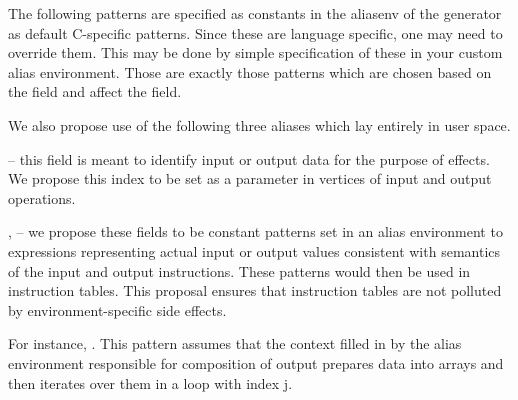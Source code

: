 The following patterns are specified as constants in the aliasenv of the generator as default C-specific patterns. Since these are language specific, one may need to override them. This may be done by simple specification of these in your custom alias environment. Those are exactly those patterns which are chosen based on the  field and affect the  field.

\begin{description}
\item {}
\item {}
\item {}
\item {}
\item {}
\end{description}

We also propose use of the following three aliases which lay entirely in user space.

\begin{description}
  \item {} -- this field is meant to identify input or output data for the purpose of effects. We propose this index to be set as a parameter in vertices of input and output operations.
  \item {},  -- we propose these fields to be constant patterns set in an alias environment to expressions representing actual input or output values consistent with semantics of the input and output instructions. These patterns would then be used in instruction tables. This proposal ensures that instruction tables are not polluted by environment-specific side effects. 

  For instance, . This pattern assumes that the context filled in by the alias environment responsible for composition of output prepares data into arrays and then iterates over them in a loop with index j. 
\end{description}


